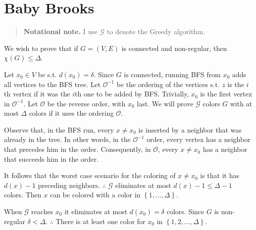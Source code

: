 
\usepackage{newtxtext} \usepackage{newtxmath}
\usepackage{graphicx}
\graphicspath{ {../Images/} }
\usepackage[utf8]{inputenc}
\usepackage[T1]{fontenc}
\usepackage{textcomp}
\usepackage{amssymb}
\usepackage{amsmath, amssymb}
\newtheorem{problem}{Problem}
\newtheorem{example}{Example}
\newtheorem{lemma}{Lemma}
\newtheorem{theorem}{Theorem}
\newtheorem{problem}{Problem}
\newtheorem{example}{Example} \newtheorem{definition}{Definition}
\newtheorem{lemma}{Lemma}
\newtheorem{theorem}{Theorem}


\clearpage 

\section{Baby Brooks}

\begin{quote}
    \textbf{Notational note.} I use $\mathcal{G}$ to denote the Greedy 
    algorithm.
\end{quote}

We wish to prove that if $G = (V, E)$ is connected and non-regular, then
$\chi(G) \leq \Delta$.

Let $x_0 \in V$ be s.t. $d(x_0) = \delta$. Since $G$ is
connected, running BFS from $x_0$ adds all vertices to the BFS tree. Let
$\mathcal{O}^{-1}$ be the ordering of the vertices s.t. $z$ is the $i$th vertex
if it was the $i$th one to be added by BFS. Trivially, $x_0$ is the first
vertex in $\mathcal{O}^{-1}$. Let $\mathcal{O}$ be the reverse order, with
$x_0$ last. We will prove $\mathcal{G}$ colors $G$ with at most $\Delta$ colors
if it uses the ordering $\mathcal{O}$.


Observe that, in the BFS run, every $x \neq x_0$ is inserted by a neighbor that
was already in the tree. In other words, in the $\mathcal{O}^{-1}$ order, every
vertex has a neighbor that precedes him in the order. Consequently, in
$\mathcal{O}$, every $x \neq x_0$ has a neighbor that succeeds him in the
order. 

It follows that the worst case scenario for the coloring of $x \neq x_0$ is
that it has $d(x) - 1$ preceding neighbors. $\therefore $ $\mathcal{G}$
eliminates at most $d(x) - 1 \leq \Delta - 1$ colors. Then $x$ can be colored
with a color in $\left\{ 1, \ldots, \Delta \right\} $.

When $\mathcal{G}$ reaches $x_0$ it eliminates at most $d(x_0) = \delta$
colors. Since $G$ is non-regular $\delta < \Delta$.
$\therefore $ There is at least one color for $x_0$
in $\left\{ 1, 2, \ldots, \Delta \right\} $.

